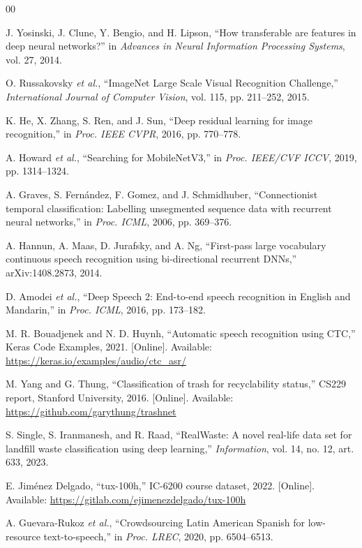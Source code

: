 \begin{thebibliography}{00}

 J. Yosinski, J. Clune, Y. Bengio, and H. Lipson, ``How transferable are features in deep neural networks?'' in \emph{Advances in Neural Information Processing Systems}, vol. 27, 2014.

 O. Russakovsky \emph{et al.}, ``ImageNet Large Scale Visual Recognition Challenge,'' \emph{International Journal of Computer Vision}, vol. 115, pp. 211--252, 2015.

 K. He, X. Zhang, S. Ren, and J. Sun, ``Deep residual learning for image recognition,'' in \emph{Proc. IEEE CVPR}, 2016, pp. 770--778.

 A. Howard \emph{et al.}, ``Searching for MobileNetV3,'' in \emph{Proc. IEEE/CVF ICCV}, 2019, pp. 1314--1324.

 A. Graves, S. Fernández, F. Gomez, and J. Schmidhuber, ``Connectionist temporal classification: Labelling unsegmented sequence data with recurrent neural networks,'' in \emph{Proc. ICML}, 2006, pp. 369--376.

 A. Hannun, A. Maas, D. Jurafsky, and A. Ng, ``First-pass large vocabulary continuous speech recognition using bi-directional recurrent DNNs,'' arXiv:1408.2873, 2014.

 D. Amodei \emph{et al.}, ``Deep Speech 2: End-to-end speech recognition in English and Mandarin,'' in \emph{Proc. ICML}, 2016, pp. 173--182.

 M. R. Bouadjenek and N. D. Huynh, ``Automatic speech recognition using CTC,'' Keras Code Examples, 2021. [Online]. Available: \url{https://keras.io/examples/audio/ctc_asr/}

 M. Yang and G. Thung, ``Classification of trash for recyclability status,'' CS229 report, Stanford University, 2016. [Online]. Available: \url{https://github.com/garythung/trashnet}

 S. Single, S. Iranmanesh, and R. Raad, ``RealWaste: A novel real-life data set for landfill waste classification using deep learning,'' \emph{Information}, vol. 14, no. 12, art. 633, 2023.

 E. Jiménez Delgado, ``tux-100h,'' IC-6200 course dataset, 2022. [Online]. Available: \url{https://gitlab.com/ejimenezdelgado/tux-100h}

 A. Guevara-Rukoz \emph{et al.}, ``Crowdsourcing Latin American Spanish for low-resource text-to-speech,'' in \emph{Proc. LREC}, 2020, pp. 6504--6513.


\end{thebibliography}
